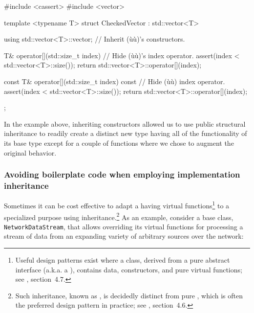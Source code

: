\begin{emcppslisting}
#include <cassert>                                                              
#include <vector>

template <typename T>
struct CheckedVector : std::vector<T>
{
    using std::vector<T>::vector;      // Inherit (ù{}ù)'s constructors.

    T& operator[](std::size_t index)   // Hide (ù{}ù)'s index operator.
    {
         assert(index < std::vector<T>::size());
         return std::vector<T>::operator[](index);
    }

    const T& operator[](std::size_t index) const  // Hide (ù{}ù) index operator.
    {
         assert(index < std::vector<T>::size());
         return std::vector<T>::operator[](index);
    }
};
\end{emcppslisting}
    
\noindent In the example above, inheriting constructors allowed us to use public
structural inheritance to readily create a distinct new type having
all of the functionality of its base type except for a couple of
functions where we chose to augment the original behavior.

\subsubsection[Avoiding boilerplate code when employing implementation inheritance]{Avoiding boilerplate code when employing implementation inheritance}\label{avoiding-boilerplate-code-when-employing-implementation-inheritance}

Sometimes it can be cost effective to adapt a 
having virtual functions{\cprotect\footnote{Useful design patterns
exist where a  class, derived from a
pure abstract interface (a.k.a. a ), contains data,
constructors, and pure virtual functions; see
  \cite{lakos2a}, section~4.7.}} to a specialized purpose
using inheritance.{\cprotect\footnote{Such inheritance, known as
, is decidedly distinct from pure
, which is often the preferred design
  pattern in practice; see \cite{lakos2b}, section~4.6.}}
As an example, consider a base class,
\lstinline!NetworkDataStream!, that allows overriding its virtual functions
for processing a stream of data from an expanding variety of arbitrary
sources over the network:

